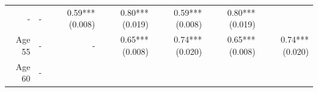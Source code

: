 \documentclass[]{article}
\begin{document}
\begin{longtable}[c]{@{}rrrrrrr@{}}
\begin{minipage}[t]{0.11\columnwidth}\raggedleft\strut
-
\strut\end{minipage} &
\begin{minipage}[t]{0.12\columnwidth}\raggedleft\strut
-
\strut\end{minipage} &
\begin{minipage}[t]{0.11\columnwidth}\raggedleft\strut
0.59*** (0.008)
\strut\end{minipage} &
\begin{minipage}[t]{0.12\columnwidth}\raggedleft\strut
0.80*** (0.019)
\strut\end{minipage} &
\begin{minipage}[t]{0.11\columnwidth}\raggedleft\strut
0.59*** (0.008)
\strut\end{minipage} &
\begin{minipage}[t]{0.11\columnwidth}\raggedleft\strut
0.80*** (0.019)
\strut\end{minipage}\tabularnewline
\begin{minipage}[t]{0.12\columnwidth}\raggedleft\strut
Age 55
\strut\end{minipage} &
\begin{minipage}[t]{0.11\columnwidth}\raggedleft\strut
-
\strut\end{minipage} &
\begin{minipage}[t]{0.12\columnwidth}\raggedleft\strut
-
\strut\end{minipage} &
\begin{minipage}[t]{0.11\columnwidth}\raggedleft\strut
0.65*** (0.008)
\strut\end{minipage} &
\begin{minipage}[t]{0.12\columnwidth}\raggedleft\strut
0.74*** (0.020)
\strut\end{minipage} &
\begin{minipage}[t]{0.11\columnwidth}\raggedleft\strut
0.65*** (0.008)
\strut\end{minipage} &
\begin{minipage}[t]{0.11\columnwidth}\raggedleft\strut
0.74*** (0.020)
\strut\end{minipage}\tabularnewline
\begin{minipage}[t]{0.12\columnwidth}\raggedleft\strut
Age 60
\strut\end{minipage} &
\begin{minipage}[t]{0.11\columnwidth}\raggedleft\strut
-
\strut\end{minipage} &
\begin{minipage}[t]{0.12\columnwidth}\raggedleft\strut

\end{minipage}
\end{longtable}
\end{document}
